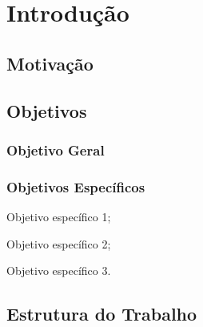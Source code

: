\chapter{Introdução}
\label{cap:introducao}

\section{M\lowercase{otivação}}
\label{sec:motivacao}

\section{O\lowercase{bjetivos}}
\label{sec:objetivos}

\subsection{Objetivo Geral}
\label{sec:objetivo-geral}

\subsection{Objetivos Específicos}

\label{sec:objetivos-especificos}
	\begin{alineas}
	    \item Objetivo específico 1;
		\item Objetivo específico 2;
		\item Objetivo específico 3.
	\end{alineas}

\section{E\lowercase{strutura do} T\lowercase{rabalho}}
\label{sec:estrutura-do-trabalho}